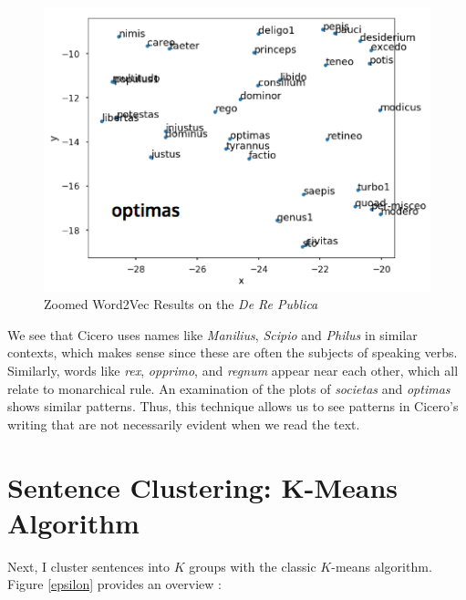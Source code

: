 \documentclass[a4paper, 12pt,notitlepage]{article} %
\newenvironment{figurecenter}{%
	\setlength\topsep{-7pt}
	\setlength\parskip{-7pt}
	\singlespacing %
	\begin{center}
	}{%
	\end{center}
\vspace{-5pt}
}
\numberwithin{dummy}{subsection}
\numberwithin{dummy}{section}
\theoremstyle{named}
\theoremstyle{definition}
\theoremstyle{definition}
\newcommand{\bld}[1]{\boldsymbol{#1}}
\begin{document}
\begin{figure}[H]
\begin{figurecenter}
\begin{minipage}{.5\textwidth}
\end{minipage}%
\begin{minipage}{.5\textwidth}
	\centering
	\includegraphics[scale=0.55]{image12.png}
\end{minipage}
	\caption{Zoomed Word2Vec Results on the \textit{De Re Publica}}
	\end{figurecenter}
\end{figure}

\noindent We see that Cicero uses names like \textit{Manilius}, \textit{Scipio} and \textit{Philus} in similar contexts, which makes sense since these are often the subjects of speaking verbs. Similarly, words like \textit{rex}, \textit{opprimo}, and \textit{regnum} appear near each other, which all relate to monarchical rule. An examination of the plots of \textit{societas} and \textit{optimas} shows similar patterns. Thus, this technique allows us to see patterns in Cicero's writing that are not necessarily evident when we read the text.

\section{Sentence Clustering: $\bld{K}$-Means Algorithm}

Next, I cluster sentences into $K$ groups with the classic $K$-means algorithm. Figure \ref{epsilon} provides an overview \cite{doccluster, pythonnlp}:

\end{document}
